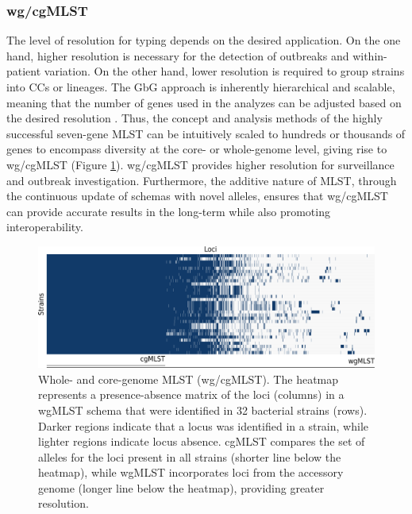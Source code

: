 \subsubsection{wg/cgMLST}

The level of resolution for typing depends on the desired application. On the one hand, higher resolution is necessary for the detection of outbreaks and within-patient variation. On the other hand, lower resolution is required to group strains into \ac{CC}s or lineages. The \ac{GbG} approach is inherently hierarchical and scalable, meaning that the number of genes used in the analyzes can be adjusted based on the desired resolution \cite{maiden_mlst_2013}. Thus, the concept and analysis methods of the highly successful seven-gene \ac{MLST} can be intuitively scaled to hundreds or thousands of genes to encompass diversity at the core- or whole-genome level, giving rise to \ac{wg/cgMLST} (Figure \ref{fig:introduction_figure8}). \ac{wg/cgMLST} provides higher resolution for surveillance and outbreak investigation. Furthermore, the additive nature of \ac{MLST}, through the continuous update of schemas with novel alleles, ensures that \ac{wg/cgMLST} can provide accurate results in the long-term while also promoting interoperability.

\begin{figure}[h!]
    \centering
    \includegraphics[angle=0,width=\textwidth]{figures/introduction/Figure8.pdf}
    \caption[Whole- and core-genome MLST]{Whole- and core-genome \ac{MLST} (\ac{wg/cgMLST}). The heatmap represents a presence-absence matrix of the loci (columns) in a wgMLST schema that were identified in 32 bacterial strains (rows). Darker regions indicate that a locus was identified in a strain, while lighter regions indicate locus absence. \ac{cgMLST} compares the set of alleles for the loci present in all strains (shorter line below the heatmap), while \ac{wgMLST} incorporates loci from the accessory genome (longer line below the heatmap), providing greater resolution.}
    \label{fig:introduction_figure8}
\end{figure}


